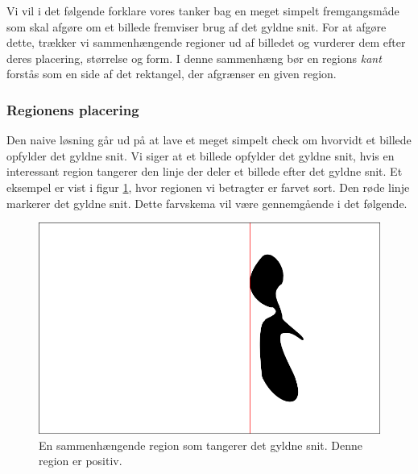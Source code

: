 {
\def\imgscale{0.34}

\textsf{Vi vil i det følgende forklare vores tanker bag en meget simpelt
fremgangsmåde som skal afgøre om et billede fremviser brug af det gyldne
snit. For at afgøre dette, trækker vi sammenhængende regioner ud af
billedet og vurderer dem efter deres placering, størrelse og form. I
denne sammenhæng bør en regions \emph{kant} forstås som en side af det
rektangel, der afgrænser en given region.}

\subsubsection{Regionens placering}
Den naive løsning går ud på at lave et meget simpelt check om hvorvidt
et billede opfylder det gyldne snit. Vi siger at et billede
opfylder det gyldne snit, hvis en interessant region tangerer den linje
der deler et billede efter det gyldne snit. Et eksempel er vist i figur
\ref{pos_naiv_1}, hvor regionen vi betragter er farvet sort. Den røde
linje markerer det gyldne snit. Dette farvskema vil være gennemgående i
det følgende.
\begin{figure}[h]
	\begin{center}
		\includegraphics[scale=\imgscale,angle=0]{afsnit/vores_implementation/billeder/naiv_algoritme/naiv_positiv_blob_1}
	\end{center}
	\caption[En positiv region]{En sammenhængende region som tangerer det gyldne snit.
	Denne region er positiv.}
	\label{pos_naiv_1}
\end{figure}

}
